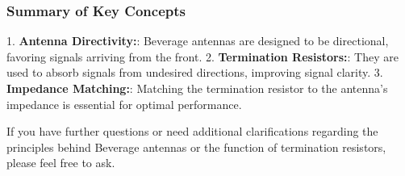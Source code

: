 \subsubsection{Summary of Key Concepts}
1. \textbf{Antenna Directivity:}: Beverage antennas are designed to be directional, favoring signals arriving from the front.
2. \textbf{Termination Resistors:}: They are used to absorb signals from undesired directions, improving signal clarity.
3. \textbf{Impedance Matching:}: Matching the termination resistor to the antenna's impedance is essential for optimal performance.

If you have further questions or need additional clarifications regarding the principles behind Beverage antennas or the function of termination resistors, please feel free to ask.

\begin{center}
\end{center}
